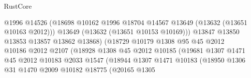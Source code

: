\begin{lexlean}{RustCore}
\begin{coremodule}
                                          @1996
                                          @14526
                                          (@18698
                                            @10162
                                            @1996
                                            @18704
                                            @14567
                                            @13649
                                            (@13632 (@13651 @10163 @2012)))
                                          @13649
                                          (@13632 (@13651 @10153 @10169)))
                                        @13847
                                        @13850
                                        @13853
                                        @13857
                                        @13862
                                        @13868)
                                      (@18729
                                        @10179
                                        @1308
                                        @95
                                        @45
                                        @2012
                                        @10186
                                        @2012
                                        @2107
                                        (@18928
                                          @1308
                                          @45
                                          @2012
                                          @10185
                                          (@19681
                                            @1307
                                            @1471
                                            @45
                                            @2012
                                            @10183
                                            @2033
                                            @1547
                                            (@18944
                                              @1307
                                              @1471
                                              @10183
                                              (@18950
                                                @1306
                                                @31
                                                @1470
                                                @2009
                                                @10182
                                                @18775
                                                (@20165
                                                  @1305

\end{coremodule}
\end{lexlean}
